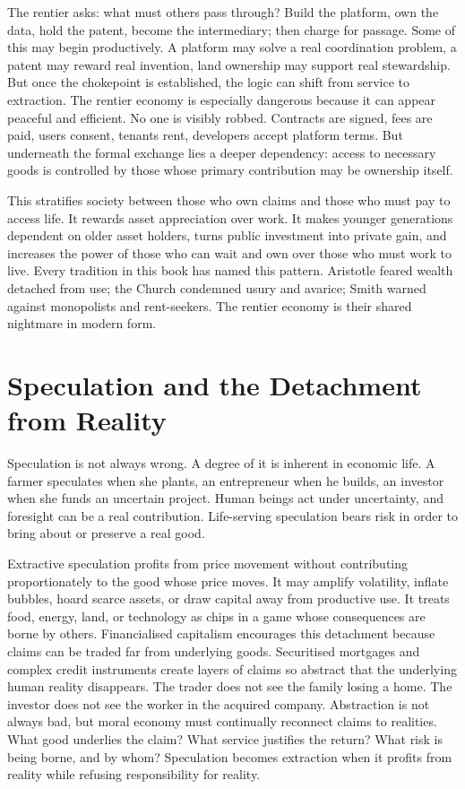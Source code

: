 \documentclass[11pt,a4paper,oneside]{book}
\begin{document}
The rentier asks: what must others pass through? Build the platform, own the data, hold the patent, become the intermediary; then charge for passage. Some of this may begin productively. A platform may solve a real coordination problem, a patent may reward real invention, land ownership may support real stewardship. But once the chokepoint is established, the logic can shift from service to extraction. The rentier economy is especially dangerous because it can appear peaceful and efficient. No one is visibly robbed. Contracts are signed, fees are paid, users consent, tenants rent, developers accept platform terms. But underneath the formal exchange lies a deeper dependency: access to necessary goods is controlled by those whose primary contribution may be ownership itself.

This stratifies society between those who own claims and those who must pay to access life. It rewards asset appreciation over work. It makes younger generations dependent on older asset holders, turns public investment into private gain, and increases the power of those who can wait and own over those who must work to live. Every tradition in this book has named this pattern. Aristotle feared wealth detached from use; the Church condemned usury and avarice; Smith warned against monopolists and rent-seekers. The rentier economy is their shared nightmare in modern form.

\section*{Speculation and the Detachment from Reality}

Speculation is not always wrong. A degree of it is inherent in economic life. A farmer speculates when she plants, an entrepreneur when he builds, an investor when she funds an uncertain project. Human beings act under uncertainty, and foresight can be a real contribution. Life-serving speculation bears risk in order to bring about or preserve a real good.

Extractive speculation profits from price movement without contributing proportionately to the good whose price moves. It may amplify volatility, inflate bubbles, hoard scarce assets, or draw capital away from productive use. It treats food, energy, land, or technology as chips in a game whose consequences are borne by others. Financialised capitalism encourages this detachment because claims can be traded far from underlying goods. Securitised mortgages and complex credit instruments create layers of claims so abstract that the underlying human reality disappears. The trader does not see the family losing a home. The investor does not see the worker in the acquired company. Abstraction is not always bad, but moral economy must continually reconnect claims to realities. What good underlies the claim? What service justifies the return? What risk is being borne, and by whom? Speculation becomes extraction when it profits from reality while refusing responsibility for reality.
\end{document}
